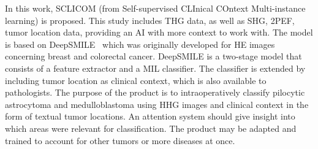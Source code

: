 In this work, SCLICOM (from Self-supervised CLInical COntext Multi-instance learning) is proposed.
This study includes THG data, as well as SHG, 2PEF, tumor location data, providing an AI with more context to work with.
The model is based on DeepSMILE~\cite{Schirris2022} which was originally developed for HE images concerning breast and colorectal cancer.
DeepSMILE is a two-stage model that consists of a feature extractor and a MIL classifier.
The classifier is extended by including tumor location as clinical context, which is also available to pathologists.
The purpose of the product is to intraoperatively classify pilocytic astrocytoma and medulloblastoma using HHG images and clinical context in the form of textual tumor locations.
An attention system should give insight into which areas were relevant for classification.
The product may be adapted and trained to account for other tumors or more diseases at once.
